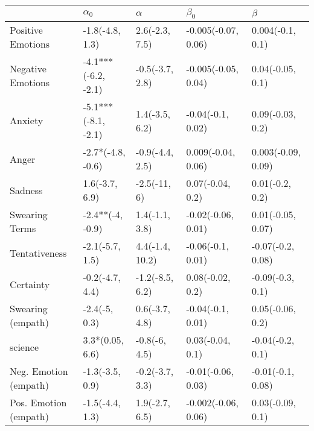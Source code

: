 \begin{tabular}{lllll}
\toprule
{} &           $\alpha_0$ &         $\alpha$ &            $\beta_0$ &             $\beta$ \\
\midrule
Positive Emotions     &      -1.8(-4.8, 1.3) &   2.6(-2.3, 7.5) &  -0.005(-0.07, 0.06) &    0.004(-0.1, 0.1) \\
Negative Emotions     &  -4.1***(-6.2, -2.1) &  -0.5(-3.7, 2.8) &  -0.005(-0.05, 0.04) &    0.04(-0.05, 0.1) \\
Anxiety               &  -5.1***(-8.1, -2.1) &   1.4(-3.5, 6.2) &    -0.04(-0.1, 0.02) &    0.09(-0.03, 0.2) \\
Anger                 &    -2.7*(-4.8, -0.6) &  -0.9(-4.4, 2.5) &   0.009(-0.04, 0.06) &  0.003(-0.09, 0.09) \\
Sadness               &       1.6(-3.7, 6.9) &     -2.5(-11, 6) &     0.07(-0.04, 0.2) &     0.01(-0.2, 0.2) \\
Swearing Terms        &     -2.4**(-4, -0.9) &   1.4(-1.1, 3.8) &   -0.02(-0.06, 0.01) &   0.01(-0.05, 0.07) \\
Tentativeness         &      -2.1(-5.7, 1.5) &  4.4(-1.4, 10.2) &    -0.06(-0.1, 0.01) &   -0.07(-0.2, 0.08) \\
Certainty             &      -0.2(-4.7, 4.4) &  -1.2(-8.5, 6.2) &     0.08(-0.02, 0.2) &    -0.09(-0.3, 0.1) \\
Swearing (empath)     &        -2.4(-5, 0.3) &   0.6(-3.7, 4.8) &    -0.04(-0.1, 0.01) &    0.05(-0.06, 0.2) \\
science               &      3.3*(0.05, 6.6) &    -0.8(-6, 4.5) &     0.03(-0.04, 0.1) &    -0.04(-0.2, 0.1) \\
Neg. Emotion (empath) &      -1.3(-3.5, 0.9) &  -0.2(-3.7, 3.3) &   -0.01(-0.06, 0.03) &   -0.01(-0.1, 0.08) \\
Pos. Emotion (empath) &      -1.5(-4.4, 1.3) &   1.9(-2.7, 6.5) &  -0.002(-0.06, 0.06) &    0.03(-0.09, 0.1) \\
\bottomrule
\end{tabular}
